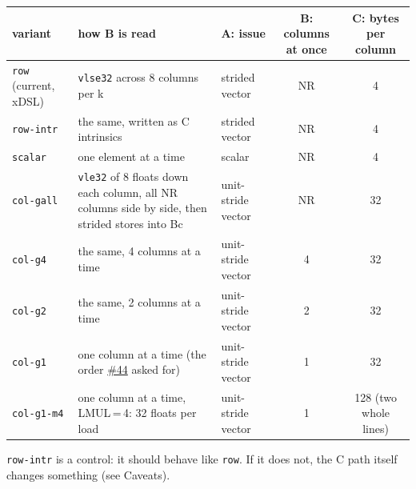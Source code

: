 \documentclass[10pt,a4paper]{article}
\newcommand{\iss}[1]{\href{https://github.com/JieGH/RVV_code_gen_via_MLIR_xDSL/issues/#1}{\##1}}
\begin{document}
\begin{center}\footnotesize\setlength{\tabcolsep}{4pt}
\begin{tabular}{@{}lp{5.6cm}lcc@{}}
\toprule
variant & how B is read & A: issue & B: columns at once & C: bytes per column \\
\midrule
\texttt{row} (current, xDSL) & \texttt{vlse32} across 8 columns per k & strided vector & NR & 4 \\
\texttt{row-intr} & the same, written as C intrinsics & strided vector & NR & 4 \\
\texttt{scalar} & one element at a time & scalar & NR & 4 \\
\texttt{col-gall} & \texttt{vle32} of 8 floats down each column, all NR columns side by side, then strided stores into Bc & unit-stride vector & NR & 32 \\
\texttt{col-g4} & the same, 4 columns at a time & unit-stride vector & 4 & 32 \\
\texttt{col-g2} & the same, 2 columns at a time & unit-stride vector & 2 & 32 \\
\texttt{col-g1} & one column at a time (the order \iss{44} asked for) & unit-stride vector & 1 & 32 \\
\texttt{col-g1-m4} & one column at a time, LMUL\,=\,4: 32 floats per load & unit-stride vector & 1 & 128 (two whole lines) \\
\bottomrule
\end{tabular}
\end{center}
\texttt{row-intr} is a control: it should behave like \texttt{row}. If it does not, the C path itself changes something (see Caveats).
\end{document}
